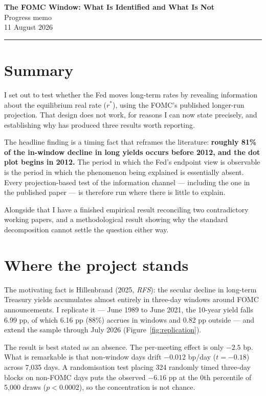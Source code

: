 \documentclass[11pt]{article}
\begin{document}
\begin{center}
{\large\textbf{The FOMC Window: What Is Identified and What Is Not}}\\[0.35em]
{\normalsize Progress memo}\\[0.2em]
{\small 11 August 2026}
\end{center}
\vspace{0.4em}
\noindent\rule{\textwidth}{0.4pt}

\section*{Summary}

I set out to test whether the Fed moves long-term rates by revealing information about the equilibrium real rate ($r^{*}$), using the FOMC's published longer-run projection. That design does not work, for reasons I can now state precisely, and establishing why has produced three results worth reporting.

The headline finding is a timing fact that reframes the literature: \textbf{roughly 81\% of the in-window decline in long yields occurs before 2012, and the dot plot begins in 2012.} The period in which the Fed's endpoint view is observable is the period in which the phenomenon being explained is essentially absent. Every projection-based test of the information channel --- including the one in the published paper --- is therefore run where there is little to explain.

Alongside that I have a finished empirical result reconciling two contradictory working papers, and a methodological result showing why the standard decomposition cannot settle the question either way.

\section{Where the project stands}

The motivating fact is Hillenbrand (2025, \emph{RFS}): the secular decline in long-term Treasury yields accumulates almost entirely in three-day windows around FOMC announcements. I replicate it --- June 1989 to June 2021, the 10-year yield falls 6.99 pp, of which 6.16 pp (88\%) accrues in windows and 0.82 pp outside --- and extend the sample through July 2026 (Figure~\ref{fig:replication}).

The result is best stated as an absence. The per-meeting effect is only $-2.5$ bp. What is remarkable is that non-window days drift $-0.012$ bp/day ($t=-0.18$) across 7{,}035 days. A randomisation test placing 324 randomly timed three-day blocks on non-FOMC days puts the observed $-6.16$ pp at the 0th percentile of 5{,}000 draws ($p<0.0002$), so the concentration is not chance.
\end{document}

